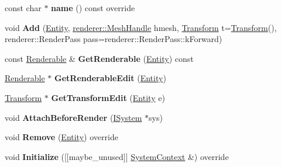 \begin{DoxyCompactItemize}
const char $\ast$ {\bfseries name} () const override
\item 
\mbox{\label{classnabla_1_1_renderable_system_addbf50152362154b41f0b2512decc9ee}} 
void {\bfseries Add} (\mbox{\hyperlink{structnabla_1_1_entity}{Entity}}, \mbox{\hyperlink{classnabla_1_1renderer_1_1_handle}{renderer\+::\+Mesh\+Handle}} hmesh, \mbox{\hyperlink{structnabla_1_1_transform}{Transform}} t=\mbox{\hyperlink{structnabla_1_1_transform}{Transform}}(), renderer\+::\+Render\+Pass pass=renderer\+::\+Render\+Pass\+::k\+Forward)
\item 
\mbox{\label{classnabla_1_1_renderable_system_a3baa70e6a014c6c1c173defe604af030}} 
const \mbox{\hyperlink{structnabla_1_1_renderable_system_1_1_renderable}{Renderable}} \& {\bfseries Get\+Renderable} (\mbox{\hyperlink{structnabla_1_1_entity}{Entity}}) const
\item 
\mbox{\label{classnabla_1_1_renderable_system_a090054d486b91247e12db25b9a179e3d}} 
\mbox{\hyperlink{structnabla_1_1_renderable_system_1_1_renderable}{Renderable}} $\ast$ {\bfseries Get\+Renderable\+Edit} (\mbox{\hyperlink{structnabla_1_1_entity}{Entity}})
\item 
\mbox{\label{classnabla_1_1_renderable_system_aefb8429e51d63accab3a93200d9e6d52}} 
\mbox{\hyperlink{structnabla_1_1_transform}{Transform}} $\ast$ {\bfseries Get\+Transform\+Edit} (\mbox{\hyperlink{structnabla_1_1_entity}{Entity}} e)
\item 
\mbox{\label{classnabla_1_1_renderable_system_af90b07101b7d61facc7258fa5ecb40ac}} 
void {\bfseries Attach\+Before\+Render} (\mbox{\hyperlink{classnabla_1_1_i_system}{I\+System}} $\ast$sys)
\item 
\mbox{\label{classnabla_1_1_renderable_system_ae19019a0394c7cd4f084c6c4fc780ccf}} 
void {\bfseries Remove} (\mbox{\hyperlink{structnabla_1_1_entity}{Entity}}) override
\item 
\mbox{\label{classnabla_1_1_renderable_system_a2134959b4154d72d0f4653ab0ee9255d}} 
void {\bfseries Initialize} (\mbox{[}\mbox{[}maybe\+\_\+unused\mbox{]}\mbox{]} \mbox{\hyperlink{structnabla_1_1_system_context}{System\+Context}} \&) override

\end{DoxyCompactItemize}
